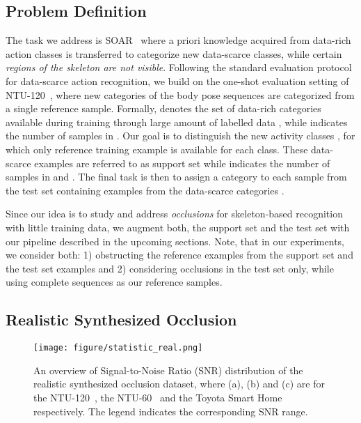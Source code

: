 \documentclass[lettersize,journal]{IEEEtran}
\begin{document}
\subsection{Problem Definition}
\label{sec:problem}
The task we address is SOAR~\cite{memmesheimer2020skeleton_dml} where a priori knowledge acquired from data-rich action classes is transferred to categorize new data-scarce classes, while certain \textit{regions of the skeleton are not visible}.
Following the standard evaluation protocol for data-scarce action recognition, we build on the one-shot evaluation setting of  NTU-120~\cite{liu2019ntu}, where new categories of the body pose sequences are categorized from a single reference sample.
Formally,  denotes the set of  data-rich categories available during training through large amount of labelled data ,  while  indicates the number of samples in .
Our goal is to distinguish the  new activity classes , for which only  reference training example is available for each class.
These data-scarce examples are referred to as support set  while  indicates the number of samples in  and .
The final task is then to assign a category  to each sample from the test set  containing examples from the data-scarce categories .

Since our idea is to study and address \textit{occlusions} for skeleton-based recognition with little training data, we augment both, the support set  and the test set  with our pipeline described in the upcoming sections. 
Note, that in our experiments, we consider both: 1) obstructing the reference examples from the support set and the test set examples and 2) considering occlusions in the test set only, while using complete sequences as our reference samples.

\subsection{Realistic Synthesized Occlusion}
\label{benchmark:realistic}

\begin{figure}[t]
\begin{center}
\texttt{[image: figure/statistic\_real.png]}
\end{center}
\caption{An overview of Signal-to-Noise Ratio (SNR) distribution of the realistic synthesized occlusion dataset, where (a), (b) and (c) are for the NTU-120~\cite{liu2019ntu}, the NTU-60~\cite{shahroudy2016ntu} and the Toyota Smart Home~\cite{Das_2019_ICCV} respectively. The legend indicates the corresponding SNR range.
}
\label{fig:statistic_synthesized}
\end{figure}
\end{document}
